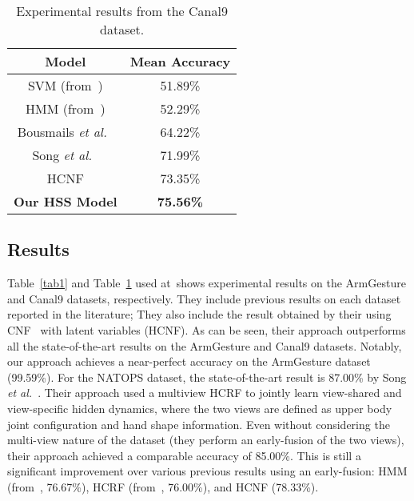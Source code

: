 \documentclass[10pt,twocolumn,letterpaper]{article}
\begin{document}
\begin{table}
\begin{center}
\begin{tabular}{|c|c|}
  \hline
  Model & Mean Accuracy \\
  \hline
  SVM (from~\cite{Modeling}) & 51.89\% \\
  HMM (from~\cite{Modeling}) & 52.29\% \\
  Bousmails \emph{et al.}~\cite{Modeling} & 64.22\% \\
  Song \emph{et al.}~\cite{Multimodal} & 71.99\% \\
  HCNF & 73.35\% \\
  \hline
  {\bf Our HSS Model} & {\bf 75.56\%} \\
  \hline
\end{tabular}
\end{center}
\caption{Experimental results from the Canal9 dataset.}
\label{tab2}
\end{table}

\subsection{Results}

Table~\ref{tab1} and Table~\ref{tab2} used at~\cite{action}shows experimental results on the ArmGesture and Canal9 datasets, respectively. They include previous results on each dataset reported in the literature; They also include the result obtained by their using CNF~\cite{Conditional} with latent variables (HCNF). As can be seen, their approach outperforms all the state-of-the-art results on the ArmGesture and Canal9 datasets. Notably, our approach achieves a near-perfect accuracy on the ArmGesture dataset (99.59\%).
For the NATOPS dataset, the state-of-the-art result is 87.00\% by Song \emph{et al.}~\cite{Multi}. Their approach used a multiview HCRF to jointly learn view-shared and view-specific hidden dynamics, where the two views are defined as upper body joint configuration and hand shape information. Even without considering the multi-view nature of the dataset (they perform an early-fusion of the two views), their approach achieved a comparable accuracy of 85.00\%. This is still a significant improvement over various previous results using an early-fusion: HMM (from~\cite{Multi}, 76.67\%), HCRF (from~\cite{Multi}, 76.00\%), and HCNF (78.33\%).


{\small

}
\end{document}

